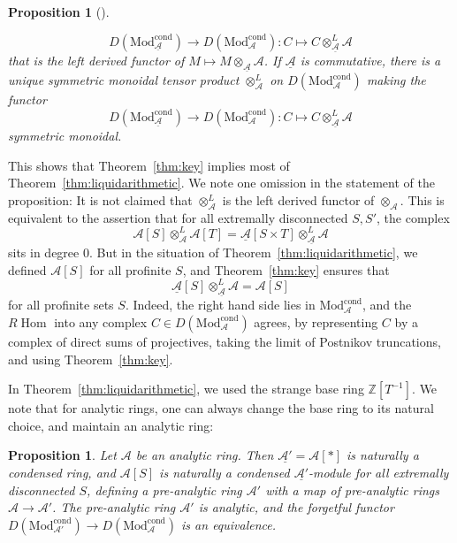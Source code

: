 \documentclass[11pt]{amsbook}
\DeclareMathOperator{\Hom}{Hom}
\newcommand{\CondMod}{\mathrm{Mod}^{\mathrm{cond}}}
\numberwithin{equation}{section}
\numberwithin{theorem}{section}
\newtheorem{proposition}[theorem]{Proposition}
\theoremstyle{definition}
\begin{document}
\begin{proposition}[{\cite[Proposition 7.5]{Condensed}}]
\begin{enumerate}
\[
D(\CondMod_{\underline{\mathcal A}})\to D(\CondMod_{\mathcal A}): C\mapsto C\otimes^L_{\underline{\mathcal A}} \mathcal A
\]
that is the left derived functor of $M\mapsto M\otimes_{\underline{\mathcal A}} \mathcal A$. If $\underline{\mathcal A}$ is commutative, there is a unique symmetric monoidal tensor product $\otimes^L_{\mathcal A}$ on $D(\CondMod_{\mathcal A})$ making the functor
\[
D(\CondMod_{\underline{\mathcal A}})\to D(\CondMod_{\mathcal A}): C\mapsto C\otimes^L_{\underline{\mathcal A}} \mathcal A
\]
symmetric monoidal.
\end{enumerate}
\end{proposition}

This shows that Theorem~\ref{thm:key} implies most of Theorem~\ref{thm:liquidarithmetic}. We note one omission in the statement of the proposition: It is not claimed that $\otimes^L_{\mathcal A}$ is the left derived functor of $\otimes_{\mathcal A}$. This is equivalent to the assertion that for all extremally disconnected $S,S'$, the complex
\[
\mathcal A[S]\otimes^L_{\mathcal A} \mathcal A[T] = \underline{\mathcal A}[S\times T]\otimes^L_{\underline{\mathcal A}} \mathcal A
\]
sits in degree $0$. But in the situation of Theorem~\ref{thm:liquidarithmetic}, we defined $\mathcal A[S]$ for all profinite $S$, and Theorem~\ref{thm:key} ensures that
\[
\underline{\mathcal A}[S]\otimes^L_{\underline{\mathcal A}} \mathcal A = \mathcal A[S]
\]
for all profinite sets $S$. Indeed, the right hand side lies in $\CondMod_{\mathcal A}$, and the $R\Hom$ into any complex $C\in D(\CondMod_{\mathcal A})$ agrees, by representing $C$ by a complex of direct sums of projectives, taking the limit of Postnikov truncations, and using Theorem~\ref{thm:key}.

In Theorem~\ref{thm:liquidarithmetic}, we used the strange base ring $\mathbb Z[T^{-1}]$. We note that for analytic rings, one can always change the base ring to its natural choice, and maintain an analytic ring:

\begin{proposition} Let $\mathcal A$ be an analytic ring. Then $\underline{\mathcal A'} = \mathcal A[\ast]$ is naturally a condensed ring, and $\mathcal A[S]$ is naturally a condensed $\underline{\mathcal A'}$-module for all extremally disconnected $S$, defining a pre-analytic ring $\mathcal A'$ with a map of pre-analytic rings $\mathcal A\to \mathcal A'$. The pre-analytic ring $\mathcal A'$ is analytic, and the forgetful functor $D(\CondMod_{\mathcal A'})\to D(\CondMod_{\mathcal A})$ is an equivalence.
\end{proposition}
\end{document}
